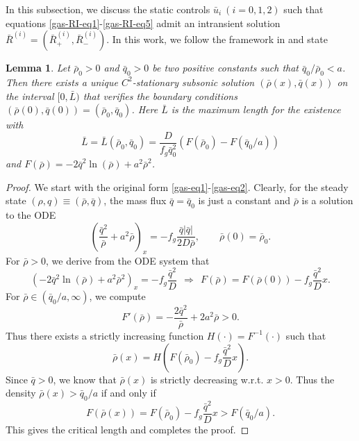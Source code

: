 \documentclass[12pt]{article}
\newtheorem{lemma}[theorem]{Lemma}
\numberwithin{equation}{section}
\begin{document}
In this subsection, we discuss the static controls $\bar{u}_i~(i=0,1,2)$ such that equations \eqref{gas-RI-eq1}-\eqref{gas-RI-eq5} admit an intransient  solution $\bar{R}^{(i)}=(\bar{R}_+^{(i)},\bar{R}_-^{(i)})$. 
In this work, we follow the framework in \cite{MR2775185} and state 
\begin{lemma}
Let $\bar{\rho}_0>0$ and $\bar{q}_0>0$ be two positive constants such that $\bar{q}_0/\bar{\rho}_0<a$. Then there exists a unique $C^2$-stationary subsonic solution $(\bar{\rho}(x), \bar{q}(x))$ on the interval $[0, \bar{L})$
that verifies the boundary conditions
$(\bar{\rho}(0), \bar{q}(0))=(\bar{\rho}_0, \bar{q}_0)$. Here $\bar{L}$ is the maximum length for the existence with 
$$
\bar{L}=\bar{L}(\bar{\rho}_0,\bar{q}_0) = \frac{D}{f_g\bar{q}_0^2}(F(\bar{\rho}_0)-F(\bar{q}_0/a))
$$
and $F(\bar{\rho})=-2 \bar{q}^2\ln(\bar{\rho}) +a^2\bar{\rho}^2$.
\end{lemma}
\begin{proof}
We start with the original form \eqref{gas-eq1}-\eqref{gas-eq2}. Clearly, for the steady state $(\rho,q)\equiv (\bar{\rho},\bar{q})$, the mass flux $\bar{q}=\bar{q}_0$ is just a constant and $\bar{\rho}$ is a solution to the ODE 
$$
\left(\frac{\bar{q}^2}{\bar{\rho}}+a^2\bar{\rho}\right)_x = -f_g\frac{\bar{q}|\bar{q}|}{2D\bar{\rho}},\qquad \bar{\rho}(0)=\bar{\rho}_0.
$$
For $\bar{\rho}>0$, we derive from the ODE system that 
$$
\left(-2 \bar{q}^2\ln(\bar{\rho}) +a^2\bar{\rho}^2\right)_x = -f_g\frac{\bar{q}^2}{D}~~\Rightarrow~~ F(\bar{\rho}) = F(\bar{\rho}(0)) -f_g\frac{\bar{q}^2}{D}x.
$$
For $\bar{\rho}\in(\bar{q}_0/a,\infty)$, we compute
$$
F'(\bar{\rho})=-\frac{2\bar{q}^2}{\bar{\rho}}+2a^2\bar{\rho}>0.
$$
Thus there exists a strictly increasing function $H(\cdot)=F^{-1}(\cdot)$ such that 
$$
\bar{\rho}(x)=H\left(F(\bar{\rho}_0) -f_g\frac{\bar{q}^2}{D}x\right).
$$
Since $\bar{q}>0$, we know that $\bar{\rho}(x)$ is strictly decreasing w.r.t. $x>0$. Thus the density $\bar{\rho}(x)>\bar{q}_0/a$ if and only if 
$$
F(\bar{\rho}(x))= F(\bar{\rho}_0) -f_g\frac{\bar{q}^2}{D}x > F(\bar{q}_0/a).
$$
This gives the critical length and completes the proof.
\end{proof}
\end{document}
